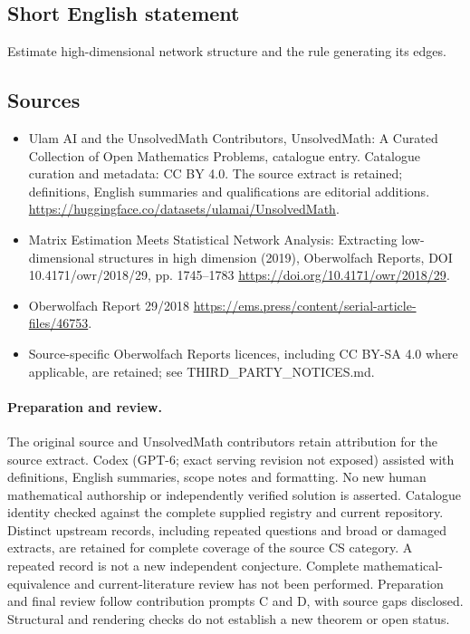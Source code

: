 \documentclass[11pt]{article}
\begin{document}
\subsection{Short English statement}
Estimate high-dimensional network structure and the rule generating its edges.
\subsection{Sources}
\begin{itemize}
\item[\hypertarget{source:statement:1}{S1}] Ulam AI and the UnsolvedMath Contributors, UnsolvedMath: A Curated Collection of Open Mathematics Problems, catalogue entry. Catalogue curation and metadata: CC BY 4.0. The source extract is retained; definitions, English summaries and qualifications are editorial additions.
\url{https://huggingface.co/datasets/ulamai/UnsolvedMath}.
\item[\hypertarget{source:statement:2}{S2}] Matrix Estimation Meets Statistical Network Analysis: Extracting low-dimensional structures in high dimension (2019), Oberwolfach Reports, DOI 10.4171/owr/2018/29, pp. 1745--1783
\url{https://doi.org/10.4171/owr/2018/29}.
\item[\hypertarget{source:statement:3}{S3}] Oberwolfach Report 29/2018
\url{https://ems.press/content/serial-article-files/46753}.
\item Source-specific Oberwolfach Reports licences, including CC BY-SA 4.0 where applicable, are retained; see THIRD\_PARTY\_NOTICES.md.
\end{itemize}
\paragraph{Preparation and review.}
The original source and UnsolvedMath contributors retain attribution for the source extract. Codex (GPT-6; exact serving revision not exposed) assisted with definitions, English summaries, scope notes and formatting. No new human mathematical authorship or independently verified solution is asserted. Catalogue identity checked against the complete supplied registry and current repository. Distinct upstream records, including repeated questions and broad or damaged extracts, are retained for complete coverage of the source CS category. A repeated record is not a new independent conjecture. Complete mathematical-equivalence and current-literature review has not been performed. Preparation and final review follow contribution prompts C and D, with source gaps disclosed. Structural and rendering checks do not establish a new theorem or open status.
\label{end:statement}
\end{document}
